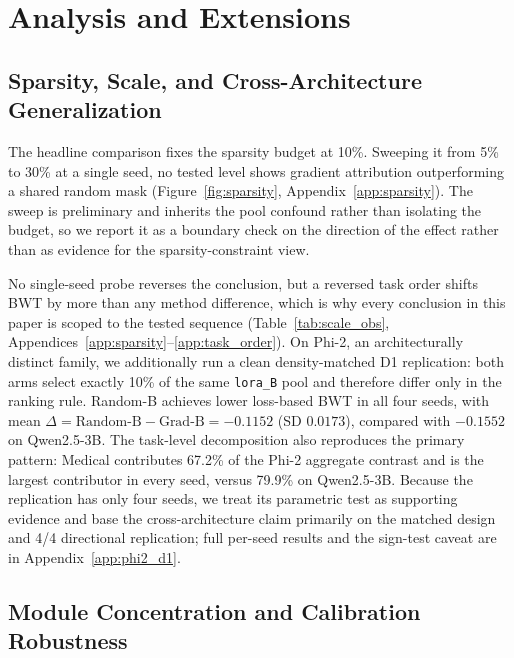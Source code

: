 \section{Analysis and Extensions}
\label{sec:analysis}

\subsection{Sparsity, Scale, and Cross-Architecture Generalization}
\label{sec:boundaries}

The headline comparison fixes the sparsity budget at 10\%. Sweeping it from 5\% to 30\% at a single seed, no tested level shows gradient attribution outperforming a shared random mask (Figure~\ref{fig:sparsity}, Appendix~\ref{app:sparsity}). The sweep is preliminary and inherits the pool confound rather than isolating the budget, so we report it as a boundary check on the direction of the effect rather than as evidence for the sparsity-constraint view.

No single-seed probe reverses the conclusion, but a reversed task order shifts BWT by more than any method difference, which is why every conclusion in this paper is scoped to the tested sequence (Table~\ref{tab:scale_obs}, Appendices~\ref{app:sparsity}--\ref{app:task_order}). On Phi-2, an architecturally distinct family, we additionally run a clean density-matched D1 replication: both arms select exactly 10\% of the same \texttt{lora\_B} pool and therefore differ only in the ranking rule. Random-B achieves lower loss-based BWT in all four seeds, with mean $\Delta=\text{Random-B}-\text{Grad-B}=-0.1152$ (SD $0.0173$), compared with $-0.1552$ on Qwen2.5-3B. The task-level decomposition also reproduces the primary pattern: Medical contributes 67.2\% of the Phi-2 aggregate contrast and is the largest contributor in every seed, versus 79.9\% on Qwen2.5-3B. Because the replication has only four seeds, we treat its parametric test as supporting evidence and base the cross-architecture claim primarily on the matched design and 4/4 directional replication; full per-seed results and the sign-test caveat are in Appendix~\ref{app:phi2_d1}.

\subsection{Module Concentration and Calibration Robustness}
\label{sec:module}

